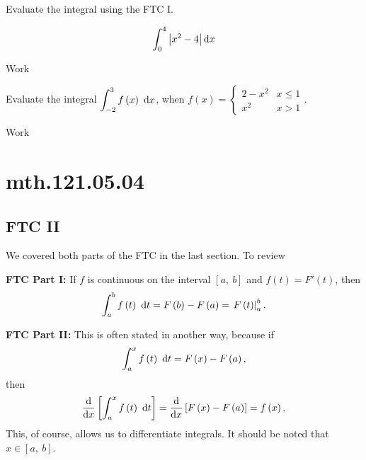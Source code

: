 \documentclass[12pt,addpoints, answers, fleqn]{exam}
\begin{document}
\begin{teacher}
\begin{questions}
Evaluate the integral using the FTC I.

\[
\int_0^4 \left| x^2 - 4 \right| {\rm{d}}x
\]

 \begin{solution}
 Work
 \end{solution}
 
\question 	%

Evaluate the integral $\displaystyle \int_{-2}^3 f \left( x \right) \ {\rm{d}}x$, when $\displaystyle f\left(x\right) = \left\{
{\begin{array}{*{20}{l}}
{2 - {x^2}} & {x \le 1}\\
{{x^2}}&{x > 1}
\end{array}} \right.$.

 \begin{solution}
 Work
 \end{solution}
 
\end{questions}
\end{teacher}
\vfill
\pagebreak

\section{mth.121.05.04}
\subsection{FTC II}
We covered both parts of the FTC in the last section. To review


\textbf{FTC Part I:} If $f$ is continuous on the interval $\left[ a, \ b \right]$ and $f\left(t\right) = F'\left( t \right)$, then
\[
\int_a^b f \left( t \right) \ {\rm{d}}t = F\left( b \right) - F\left( a \right) = \left. F\left( t \right) \right|_a^b.
\]

\textbf{FTC Part II:}
This is often stated in another way, because if
\[
\int_a^x f \left( t \right) \ {\rm{d}}t = F\left( x \right) - F\left( a \right),
\]
then
\[
\frac{{\rm{d}}}{{\rm{d}}x}\left[ \int_a^x f \left( t \right) \ {\rm{d}}t \right] = \frac{{\rm{d}}}{{\rm{d}}x}\left[ F\left( x \right) - F\left( a \right)\right] = f \left( x \right).
\]
This, of course, allows us to differentiate integrals. It should be noted that $x \in \left[ a, \ b \right]$.
\end{document}
